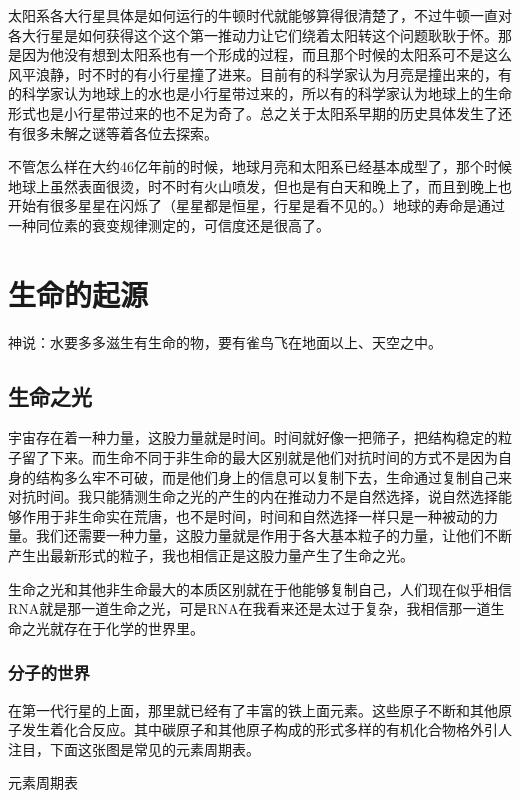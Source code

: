 \documentclass[12pt]{exam}%
\begin{document}
太阳系各大行星具体是如何运行的牛顿时代就能够算得很清楚了，不过牛顿一直对各大行星是如何获得这个这个第一推动力让它们绕着太阳转这个问题耿耿于怀。那是因为他没有想到太阳系也有一个形成的过程，而且那个时候的太阳系可不是这么风平浪静，时不时的有小行星撞了进来。目前有的科学家认为月亮是撞出来的，有的科学家认为地球上的水也是小行星带过来的，所以有的科学家认为地球上的生命形式也是小行星带过来的也不足为奇了。总之关于太阳系早期的历史具体发生了还有很多未解之谜等着各位去探索。

不管怎么样在大约46亿年前的时候，地球月亮和太阳系已经基本成型了，那个时候地球上虽然表面很烫，时不时有火山喷发，但也是有白天和晚上了，而且到晚上也开始有很多星星在闪烁了（星星都是恒星，行星是看不见的。）地球的寿命是通过一种同位素的衰变规律测定的，可信度还是很高了。


\section{生命的起源}
\begin{flushright}
\begin{notecard}[ce7f4fe]{12em}
神说：水要多多滋生有生命的物，要有雀鸟飞在地面以上、天空之中。  
\end{notecard}
\end{flushright}

\subsection{生命之光}
宇宙存在着一种力量，这股力量就是时间。时间就好像一把筛子，把结构稳定的粒子留了下来。而生命不同于非生命的最大区别就是他们对抗时间的方式不是因为自身的结构多么牢不可破，而是他们身上的信息可以复制下去，生命通过复制自己来对抗时间。我只能猜测生命之光的产生的内在推动力不是自然选择，说自然选择能够作用于非生命实在荒唐，也不是时间，时间和自然选择一样只是一种被动的力量。我们还需要一种力量，这股力量就是作用于各大基本粒子的力量，让他们不断产生出最新形式的粒子，我也相信正是这股力量产生了生命之光。

生命之光和其他非生命最大的本质区别就在于他能够复制自己，人们现在似乎相信RNA就是那一道生命之光，可是RNA在我看来还是太过于复杂，我相信那一道生命之光就存在于化学的世界里。

\subsubsection{分子的世界}
在第一代行星的上面，那里就已经有了丰富的铁上面元素。这些原子不断和其他原子发生着化合反应。其中碳原子和其他原子构成的形式多样的有机化合物格外引人注目，下面这张图是常见的元素周期表。
\begin{linefig}{元素周期表}
\caption{元素周期表}
\label{fig:元素周期表}
\end{linefig}
\end{document}
